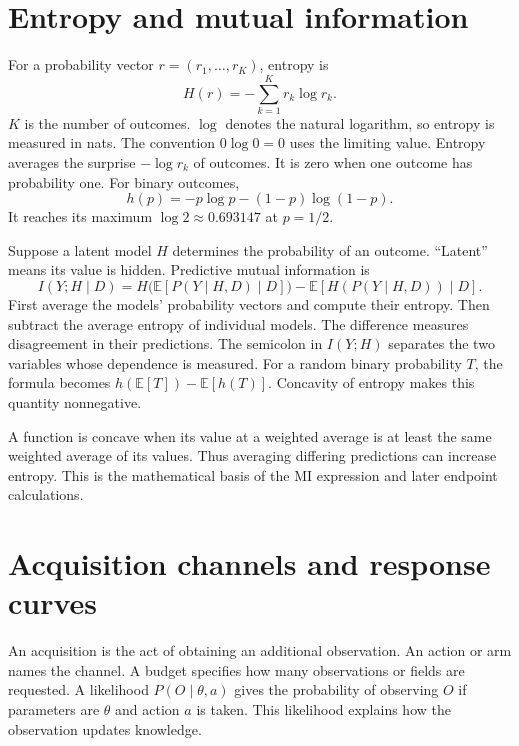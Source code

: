 \documentclass[11pt,a4paper]{report}
\newcommand{\E}{\mathbb E}
\begin{document}
\section{Entropy and mutual information}
For a probability vector $r=(r_1,\ldots,r_K)$, entropy is
\begin{equation}
H(r)=-\sum_{k=1}^K r_k\log r_k.
\end{equation}
$K$ is the number of outcomes. $\log$ denotes the natural logarithm, so entropy is measured in nats. The convention $0\log0=0$ uses the limiting value. Entropy averages the surprise $-\log r_k$ of outcomes. It is zero when one outcome has probability one. For binary outcomes,
\begin{equation}
h(p)=-p\log p-(1-p)\log(1-p).
\end{equation}
It reaches its maximum $\log2\approx0.693147$ at $p=1/2$.

Suppose a latent model $H$ determines the probability of an outcome. ``Latent'' means its value is hidden. Predictive mutual information is
\begin{equation}
I(Y;H\mid D)=H\big(\E[P(Y\mid H,D)\mid D]\big)
-\E[H(P(Y\mid H,D))\mid D].
\label{eq:mi}
\end{equation}
First average the models' probability vectors and compute their entropy. Then subtract the average entropy of individual models. The difference measures disagreement in their predictions. The semicolon in $I(Y;H)$ separates the two variables whose dependence is measured. For a random binary probability $T$, the formula becomes $h(\E[T])-\E[h(T)]$. Concavity of entropy makes this quantity nonnegative.

A function is concave when its value at a weighted average is at least the same weighted average of its values. Thus averaging differing predictions can increase entropy. This is the mathematical basis of the MI expression and later endpoint calculations.

\section{Acquisition channels and response curves}
An acquisition is the act of obtaining an additional observation. An action or arm names the channel. A budget specifies how many observations or fields are requested. A likelihood $P(O\mid\theta,a)$ gives the probability of observing $O$ if parameters are $\theta$ and action $a$ is taken. This likelihood explains how the observation updates knowledge.
\end{document}
